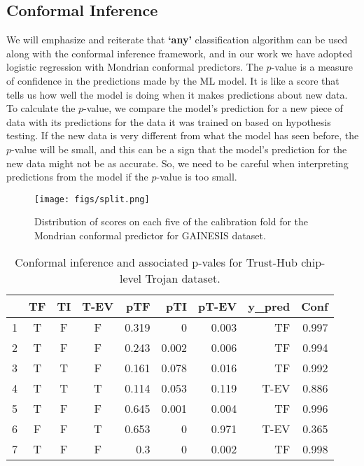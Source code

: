 \documentclass[9pt,conference]{IEEEtran}
\begin{document}
\subsection{Conformal Inference}
\label{Sec:ConformalInference} 
We will emphasize and reiterate that \textbf{`any'} classification algorithm can be used along with the conformal inference framework, and in our work we have adopted logistic regression with Mondrian conformal predictors. The $p$-value is a measure of confidence in the predictions made by the ML model. It is like a score that tells us how well the model is doing when it makes predictions about new data. To calculate the $p$-value, we compare the model's prediction for a new piece of data with its predictions for the data it was trained on based on hypothesis testing. If the new data is very different from what the model has seen before, the $p$-value will be small, and this can be a sign that the model's prediction for the new data might not be as accurate. So, we need to be careful when interpreting predictions from the model if the $p$-value is too small.

\begin{figure*}[]
\centering
  \texttt{[image: figs/split.png]}
  \caption{Distribution of scores on each five of the calibration fold for the Mondrian conformal predictor for GAINESIS dataset.}
  \label{fig:b_fold}
\end{figure*}

\begin{table}[t]
\centering
\caption{Conformal inference and associated p-vales for Trust-Hub chip-level Trojan dataset.}
\begin{tabular}{lcccrrrrr}
\hline
  & \textbf{TF} & \textbf{TI} & \textbf{T-EV} & \textbf{pTF} & \textbf{pTI} & \textbf{pT-EV} & \textbf{y\_pred} & \textbf{Conf}\\ \hline
1 & T           & F           & F           & 0.319        & 0            & 0.003        & TF  & 0.997             \\ \hline
2 & T           & F           & F           & 0.243        & 0.002        & 0.006        & TF  & 0.994             \\ \hline
3 & T           & T           & F           & 0.161        & 0.078        & 0.016        & TF   & 0.992            \\ \hline
4 & T           & T           & T           & 0.114        & 0.053        & 0.119        & T-EV  & 0.886           \\ \hline
5 & T           & F           & F           & 0.645        & 0.001        & 0.004            & TF   & 0.996           \\ \hline
6 & F           & F           & T           & 0.653            & 0            & 0.971        & T-EV    & 0.365         \\ \hline
7 & T           & F           & F           & 0.3          & 0            & 0.002        & TF      & 0.998         \\ \hline
\end{tabular}
\label{tab:conformalresults}
\end{table}
\end{document}
